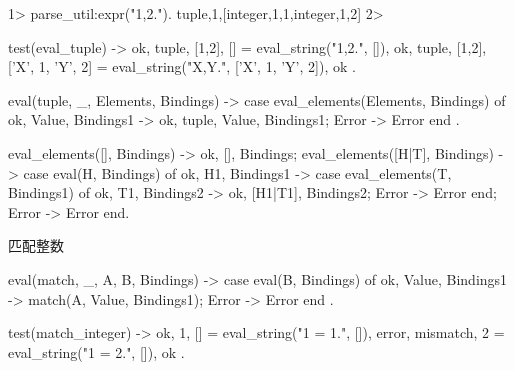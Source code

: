 \documentclass[preview,multi,crop=false,border=1in,class=memoir]{standalone}
\begin{document}
\begin{preview-page}
\begin{ErlangShellSession}
1> parse_util:expr("{1,2}.").
{tuple,1,[{integer,1,1},{integer,1,2}]}
2>
\end{ErlangShellSession}


\begin{SourceCode}
test(eval_tuple) ->
    {ok, {tuple, [1,2]}, []} = eval_string("{1,2}.", []),
    {ok, {tuple, [1,2]}, [{'X', 1}, {'Y', 2}]} = eval_string("{X,Y}.", [{'X', 1}, {'Y', 2}]),
    ok
.
\end{SourceCode}


\begin{SourceCode}
eval({tuple, _, Elements}, Bindings) ->
    case eval_elements(Elements, Bindings) of
        {ok, Value, Bindings1} ->
            {ok, {tuple, Value}, Bindings1};
        Error ->
            Error
    end
.
\end{SourceCode}


\begin{SourceCode}
eval_elements([], Bindings) ->
    {ok, [], Bindings};
eval_elements([H|T], Bindings) ->
    case eval(H, Bindings) of
        {ok, H1, Bindings1} ->
            case eval_elements(T, Bindings1) of
                {ok, T1, Bindings2} ->
                    {ok, [H1|T1], Bindings2};
                Error ->
                    Error
            end;
        Error ->
            Error
    end.
\end{SourceCode}


匹配整数

\begin{SourceCode}
eval({match, _, A, B}, Bindings) ->
    case eval(B, Bindings) of
        {ok, Value, Bindings1} ->
            match(A, Value, Bindings1);
        Error ->
            Error
    end
.
\end{SourceCode}


\begin{SourceCode}
test(match_integer) ->
    {ok, 1, []} = eval_string("1 = 1.", []),
    {error, {mismatch, 2}} = eval_string("1 = 2.", []),
    ok
.
\end{SourceCode}



\end{preview-page}
\end{document}
